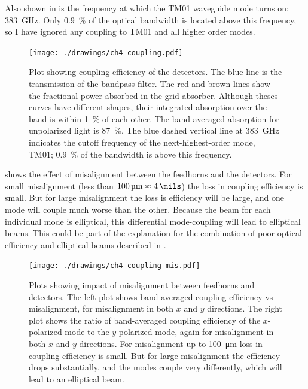 Also shown in  is the frequency at which the TM01 waveguide mode turns on: \SI{383}{\GHz}.
Only \SI{0.9}{\percent} of the optical bandwidth is located above this frequency, so I have ignored any coupling to TM01 and all higher order modes.

\begin{figure}
\centering
\texttt{[image: ./drawings/ch4-coupling.pdf]}
\caption[Detector coupling efficiency]{
  Plot showing coupling efficiency of the detectors.
  The blue line is the transmission of the bandpass filter.
  The red and brown lines show the fractional power absorbed in the grid absorber.
  Although theses curves have different shapes, their integrated absorption over the band is within \SI{1}{\percent} of each other.
  The band-averaged absorption for unpolarized light is \SI{87}{\percent}.
  The blue dashed vertical line at \SI{383}{\GHz} indicates the cutoff frequency of the next-highest-order mode, TM01; \SI{0.9}{\percent} of the bandwidth is above this frequency.
}
\label{fig:ch4-coupling}
\end{figure}

 shows the effect of misalignment between the feedhorns and the detectors.
For small misalignment (less than $\SI{100}{\um} \approx \SI{4}{\mils}$) the loss in coupling efficiency is small.
But for large misalignment the loss is efficiency will be large, and one mode will couple much worse than the other.
Because the beam for each individual mode is elliptical, this differential mode-coupling will lead to elliptical beams.
This could be part of the explanation for the combination of poor optical efficiency and elliptical beams described in .

\begin{figure}
\centering
\texttt{[image: ./drawings/ch4-coupling-mis.pdf]}
\caption[Feedhorn / detector misalignment]{
  Plots showing impact of misalignment between feedhorns and detectors.
  The left plot shows band-averaged coupling efficiency vs misalignment, for misalignment in both $x$ and $y$ directions.
  The right plot shows the ratio of band-averaged coupling efficiency of the $x$-polarized mode to the $y$-polarized mode, again for misalignment in both $x$ and $y$ directions.
  For misalignment up to \SI{100}{\um} loss in coupling efficiency is small.
  But for large misalignment the efficiency drops substantially, and the modes couple very differently, which will lead to an elliptical beam.
}
\label{fig:ch4-coupling-mis}
\end{figure}

